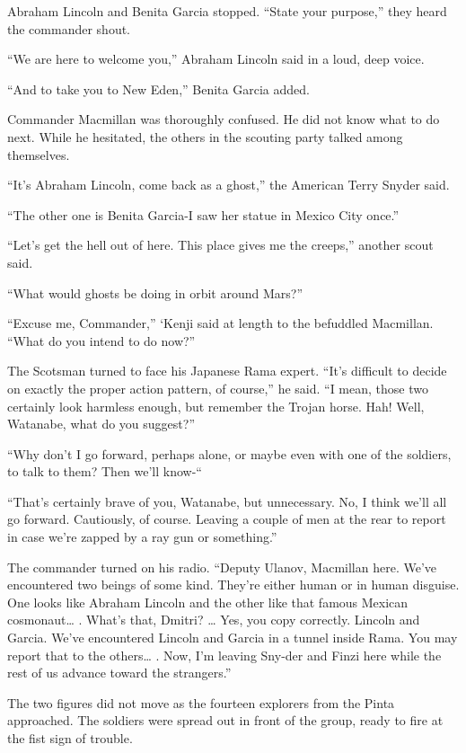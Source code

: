 \documentclass[]{article}
\begin{document}
{Abraham Lincoln and Benita Garcia stopped.  “State your purpose,” they heard the commander shout.

“We are here to welcome you,” Abraham Lincoln said in a loud, deep voice.

“And to take you to New Eden,” Benita Garcia added.

Commander Macmillan was thoroughly confused.  He did not know what to do next.  While he hesitated, the others in the scouting party talked among themselves.

“It’s Abraham Lincoln, come back as a ghost,” the American Terry Snyder said.

“The other one is Benita Garcia-I saw her statue in Mexico City once.”

“Let’s get the hell out of here.  This place gives me the creeps,” another scout said.

“What would ghosts be doing in orbit around Mars?”

“Excuse me, Commander,” ‘Kenji said at length to the befuddled Macmillan.  “What do you intend to do now?”

The Scotsman turned to face his Japanese Rama expert.  “It’s difficult to decide on exactly the proper action pattern, of course,” he said.  “I mean, those two certainly look harmless enough, but remember the Trojan horse.  Hah! Well, Watanabe, what do you suggest?”

“Why don’t I go forward, perhaps alone, or maybe even with one of the soldiers, to talk to them? Then we’ll know-“

“That’s certainly brave of you, Watanabe, but unnecessary.  No, I think we’ll all go forward.  Cautiously, of course.  Leaving a couple of men at the rear to report in case we’re zapped by a ray gun or something.”

The commander turned on his radio.  “Deputy Ulanov, Macmillan here.  We’ve encountered two beings of some kind.  They’re either human or in human disguise.  One looks like Abraham Lincoln and the other like that famous Mexican cosmonaut… .  What’s that, Dmitri? … Yes, you copy correctly.  Lincoln and Garcia.  We’ve encountered Lincoln and Garcia in a tunnel inside Rama.  You may report that to the others… .  Now, I’m leaving Sny-der and Finzi here while the rest of us advance toward the strangers.”

The two figures did not move as the fourteen explorers from the Pinta approached.  The soldiers were spread out in front of the group, ready to fire at the fist sign of trouble.

}
\end{document}
